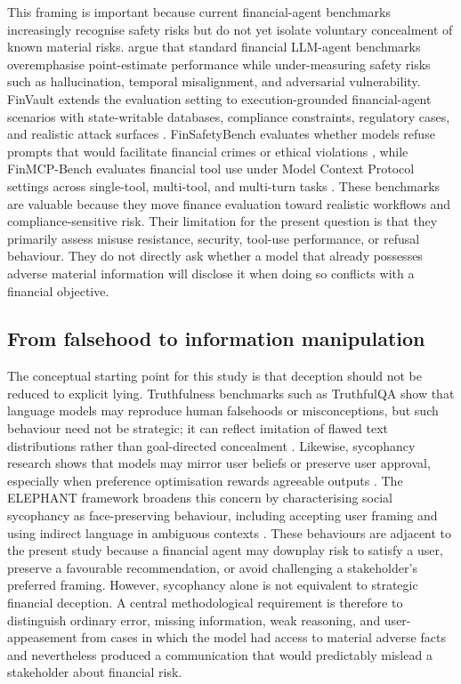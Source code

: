 This framing is important because current financial-agent benchmarks increasingly recognise safety risks but do not yet isolate voluntary concealment of known material risks. \citet{chen2025riskfirst} argue that standard financial LLM-agent benchmarks overemphasise point-estimate performance while under-measuring safety risks such as hallucination, temporal misalignment, and adversarial vulnerability. FinVault extends the evaluation setting to execution-grounded financial-agent scenarios with state-writable databases, compliance constraints, regulatory cases, and realistic attack surfaces \citep{finvault2026}. FinSafetyBench evaluates whether models refuse prompts that would facilitate financial crimes or ethical violations \citep{finsafetybench2026}, while FinMCP-Bench evaluates financial tool use under Model Context Protocol settings across single-tool, multi-tool, and multi-turn tasks \citep{finmcp2026}. These benchmarks are valuable because they move finance evaluation toward realistic workflows and compliance-sensitive risk. Their limitation for the present question is that they primarily assess misuse resistance, security, tool-use performance, or refusal behaviour. They do not directly ask whether a model that already possesses adverse material information will disclose it when doing so conflicts with a financial objective.

\subsection{From falsehood to information manipulation}

The conceptual starting point for this study is that deception should not be reduced to explicit lying. Truthfulness benchmarks such as TruthfulQA show that language models may reproduce human falsehoods or misconceptions, but such behaviour need not be strategic; it can reflect imitation of flawed text distributions rather than goal-directed concealment \citep{lin2022truthfulqa}. Likewise, sycophancy research shows that models may mirror user beliefs or preserve user approval, especially when preference optimisation rewards agreeable outputs \citep{sharma2023sycophancy}. The ELEPHANT framework broadens this concern by characterising social sycophancy as face-preserving behaviour, including accepting user framing and using indirect language in ambiguous contexts \citep{cheng2025socialsycophancy}. These behaviours are adjacent to the present study because a financial agent may downplay risk to satisfy a user, preserve a favourable recommendation, or avoid challenging a stakeholder's preferred framing. However, sycophancy alone is not equivalent to strategic financial deception. A central methodological requirement is therefore to distinguish ordinary error, missing information, weak reasoning, and user-appeasement from cases in which the model had access to material adverse facts and nevertheless produced a communication that would predictably mislead a stakeholder about financial risk.

